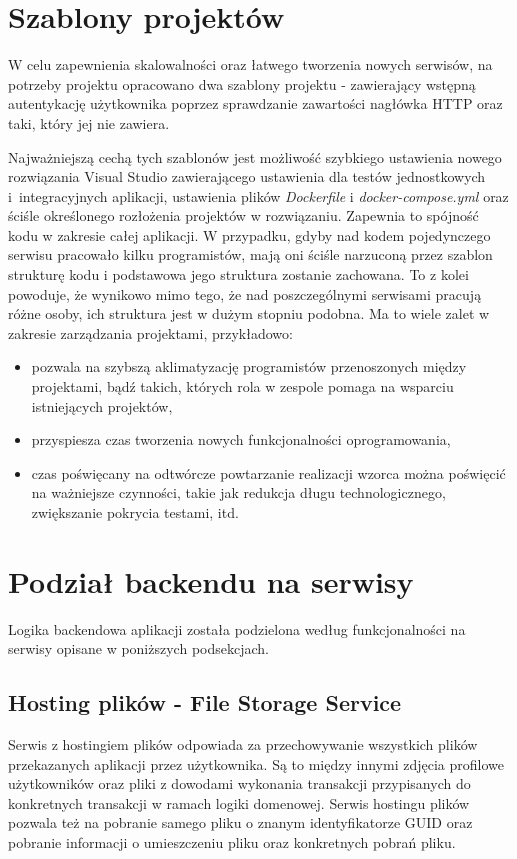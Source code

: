 \documentclass{SGGW-thesis}
\begin{document}
\section{Szablony projektów}
W celu zapewnienia skalowalności oraz łatwego tworzenia nowych serwisów, na potrzeby projektu opracowano dwa szablony projektu - zawierający wstępną autentykację użytkownika poprzez sprawdzanie zawartości nagłówka HTTP oraz taki, który jej nie zawiera.

Najważniejszą cechą tych szablonów jest możliwość szybkiego ustawienia nowego rozwiązania Visual Studio zawierającego ustawienia dla testów jednostkowych i~integracyjnych aplikacji, ustawienia plików \textit{Dockerfile} i \textit{docker-compose.yml} oraz ściśle określonego rozłożenia projektów w rozwiązaniu. Zapewnia to spójność kodu w zakresie całej aplikacji. W przypadku, gdyby nad kodem pojedynczego serwisu pracowało kilku programistów, mają oni ściśle narzuconą przez szablon strukturę kodu i podstawowa jego struktura zostanie zachowana. To z kolei powoduje, że wynikowo mimo tego, że nad poszczególnymi serwisami pracują różne osoby, ich struktura jest w dużym stopniu podobna. Ma to wiele zalet w zakresie zarządzania projektami, przykładowo:

\begin{itemize}
	\item pozwala na szybszą aklimatyzację programistów przenoszonych między projektami, bądź takich, których rola w zespole pomaga na wsparciu istniejących projektów,
	\item przyspiesza czas tworzenia nowych funkcjonalności oprogramowania,
	\item czas poświęcany na odtwórcze powtarzanie realizacji wzorca można poświęcić na ważniejsze czynności, takie jak redukcja długu technologicznego, zwiększanie pokrycia testami, itd.
\end{itemize}

\section{Podział backendu na serwisy}
Logika backendowa aplikacji została podzielona według funkcjonalności na serwisy opisane w poniższych podsekcjach.

\subsection{Hosting plików - File Storage Service}
Serwis z hostingiem plików odpowiada za przechowywanie wszystkich plików przekazanych aplikacji przez użytkownika. Są to między innymi zdjęcia profilowe użytkowników oraz pliki z dowodami wykonania transakcji przypisanych do konkretnych transakcji w ramach logiki domenowej. Serwis hostingu plików pozwala też na pobranie samego pliku o znanym identyfikatorze GUID oraz pobranie informacji o umieszczeniu pliku oraz konkretnych pobrań pliku.
\end{document}
